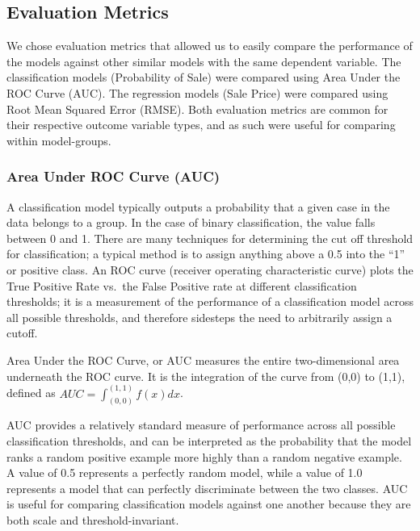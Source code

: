 \documentclass[12pt,]{article}
\begin{document}
\hypertarget{evaluation-metrics}{%
\subsection{Evaluation Metrics}\label{evaluation-metrics}}

We chose evaluation metrics that allowed us to easily compare the
performance of the models against other similar models with the same
dependent variable. The classification models (Probability of Sale) were
compared using Area Under the ROC Curve (AUC). The regression models
(Sale Price) were compared using Root Mean Squared Error (RMSE). Both
evaluation metrics are common for their respective outcome variable
types, and as such were useful for comparing within model-groups.

\hypertarget{area-under-roc-curve-auc}{%
\subsubsection{Area Under ROC Curve
(AUC)}\label{area-under-roc-curve-auc}}

A classification model typically outputs a probability that a given case
in the data belongs to a group. In the case of binary classification,
the value falls between 0 and 1. There are many techniques for
determining the cut off threshold for classification; a typical method
is to assign anything above a 0.5 into the ``1'' or positive class. An
ROC curve (receiver operating characteristic curve) plots the True
Positive Rate vs.~the False Positive rate at different classification
thresholds; it is a measurement of the performance of a classification
model across all possible thresholds, and therefore sidesteps the need
to arbitrarily assign a cutoff.

Area Under the ROC Curve, or AUC measures the entire two-dimensional
area underneath the ROC curve. It is the integration of the curve from
(0,0) to (1,1), defined as \(AUC = \int_{(0,0)}^{(1,1)} f(x)dx\).

AUC provides a relatively standard measure of performance across all
possible classification thresholds, and can be interpreted as the
probability that the model ranks a random positive example more highly
than a random negative example. A value of 0.5 represents a perfectly
random model, while a value of 1.0 represents a model that can perfectly
discriminate between the two classes. AUC is useful for comparing
classification models against one another because they are both scale
and threshold-invariant.
\end{document}
